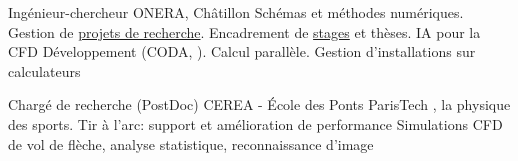 \documentclass[french]{RMcv}
\begin{document}






%
%
%
        {Ing\'enieur-chercheur}%
        {ONERA, Ch\^atillon}%
        {Sch\'emas et m\'ethodes num\'eriques. Gestion de \href{\NextSimlink}{projets de recherche}. Encadrement de \href{\articleJeanlink}{stages} et th\`eses. IA pour la CFD}%
        {D\'eveloppement (CODA, \CoMMAhref). Calcul parall\`ele. Gestion d'installations sur calculateurs}

%
%
        {Charg\'e de recherche (PostDoc)}%
        {CEREA - \'Ecole des Ponts ParisTech}%
        {\SciencesJOhref{}, la physique des sports. Tir \`a l'arc: support et am\'elioration de performance}%
        {Simulations CFD de vol de fl\`eche, analyse statistique, reconnaissance d'image}
\end{document}

